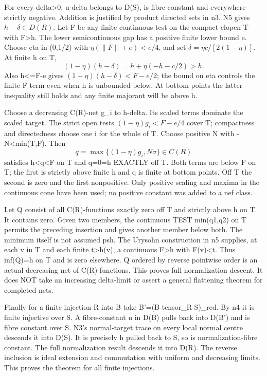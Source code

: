 \documentclass[11pt]{article}
\begin{document}
For every delta>0, u-delta belongs to D(S), is fibre constant and everywhere strictly negative. Addition is justified by product directed sets in n3. N5 gives \(h-\delta\in D(R)\). Let F be any finite continuous test on the compact clopen T with F>h. The lower semicontinuous gap has a positive finite lower bound e. Choose eta in (0,1/2) with \(\eta(\|F\|+e)<e/4\), and set \(\delta=\eta c/[2(1-\eta)]\). At finite h on T,
\[
 (1-\eta)(h-\delta)=h+\eta(-h-c/2)>h.
\]
Also h<=F-e gives \((1-\eta)(h-\delta)<F-e/2\); the bound on eta controls the finite F term even when h is unbounded below. At bottom points the latter inequality still holds and any finite majorant will be above h.

Choose a decreasing C(R)-net g\_i to h-delta. Its scaled terms dominate the scaled target. The strict open tests \((1-\eta)g_i<F-e/4\) cover T; compactness and directedness choose one i for the whole of T. Choose positive N with -N<min(T,F). Then
\[
 q=\max\{(1-\eta)g_i,N\sigma\}\in C(R)
\]
satisfies h<q<F on T and q=0=h EXACTLY off T. Both terms are below F on T; the first is strictly above finite h and q is finite at bottom points. Off T the second is zero and the first nonpositive. Only positive scaling and maxima in the continuous cone have been used; no positive constant was added to a nef class.

Let Q consist of all C(R)-functions exactly zero off T and strictly above h on T. It contains zero. Given two members, the continuous TEST min(q1,q2) on T permits the preceding insertion and gives another member below both. The minimum itself is not assumed psh. The Urysohn construction in n5 supplies, at each v in T and each finite t>h(v), a continuous F>h with F(v)<t. Thus inf(Q)=h on T and is zero elsewhere. Q ordered by reverse pointwise order is an actual decreasing net of C(R)-functions. This proves full normalization descent. It does NOT take an increasing delta-limit or assert a general flattening theorem for completed nets.

Finally for a finite injection R into B take B'=(B tensor\_R S)\_red. By n4 it is finite injective over S. A fibre-constant u in D(B) pulls back into D(B') and is fibre constant over S. N3's normal-target trace on every local normal centre descends it into D(S). It is precisely h pulled back to S, so is normalization-fibre constant. The full normalization result descends it into D(R). The reverse inclusion is ideal extension and commutation with uniform and decreasing limits. This proves the theorem for all finite injections.
\end{document}
